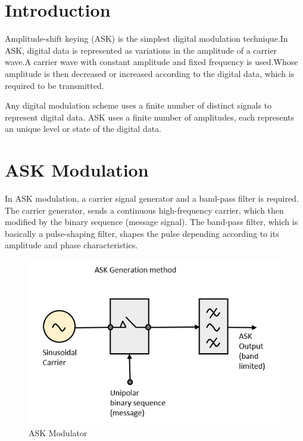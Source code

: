 \documentclass{report}
\begin{document}
	\section{Introduction}
	\bigskip
	Amplitude-shift keying (ASK) is the simplest digital modulation technique.In ASK, digital data is represented as variations in the amplitude of a carrier wave.A carrier wave with constant amplitude and fixed frequency is used.Whose amplitude is then decreased or increased according to the digital data, which is required to be transmitted.  
	
	Any digital modulation scheme uses a finite number of distinct signals to represent digital data. ASK uses a finite number of amplitudes, each represents an unique level or state of the digital data. 
	
	\section{ASK Modulation}
	
	In ASK modulation, a carrier signal generator and a band-pass filter is required. The carrier generator, sends a continuous high-frequency carrier, which then modified by the binary sequence (message signal). 
	The band-pass filter, which is basically a  pulse-shaping filter, shapes the pulse depending according to its amplitude and phase characteristics.\bigskip
	
	
	\begin{figure}[H]
		\centering
		\includegraphics[scale=0.5]{images/ask_modulator.jpg}
		\caption{ASK Modulator}
	\end{figure}	
	
	\bigskip
\end{document}
